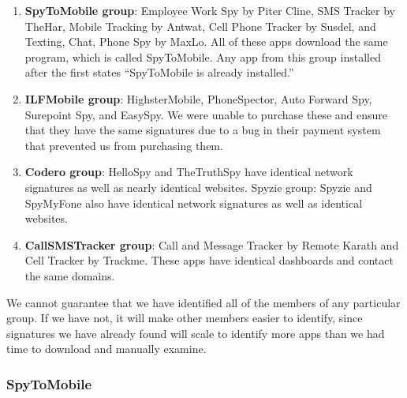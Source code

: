 \documentclass[acmtog]{acmart}
\begin{document}
\begin{enumerate}
	\item \textbf{SpyToMobile group}: Employee Work Spy by Piter Cline, SMS 
	Tracker by TheHar, Mobile Tracking by Antwat, Cell Phone Tracker by Susdel, 
	and Texting, Chat, 
	Phone Spy by MaxLo. All of these apps download the same program, which is 
	called SpyToMobile. Any app from this group installed after the first 
	states ``SpyToMobile is already installed.''
	\item \textbf{ILFMobile group}: HighsterMobile, PhoneSpector, Auto Forward 
	Spy, Surepoint Spy, and EasySpy. We were unable to purchase these and 
	ensure that they have the same signatures due to a bug in their payment 
	system that prevented us from purchasing them.
	\item \textbf{Codero group}: HelloSpy and TheTruthSpy have identical 
	network signatures as well as nearly identical websites.
	Spyzie group: Spyzie and SpyMyFone also have identical network signatures 
	as well as identical websites.
	\item \textbf{CallSMSTracker group}: Call and Message Tracker by Remote 
	Karath and Cell Tracker by Trackme. These apps have identical dashboards 
	and contact the same domains.
\end{enumerate}
We cannot guarantee that we have identified all of the members of any 
particular group. If we have not, it will make other members easier to 
identify, since signatures we have already found will scale to identify more 
apps than we had time to download and manually examine.

\subsubsection{SpyToMobile}
\end{document}
